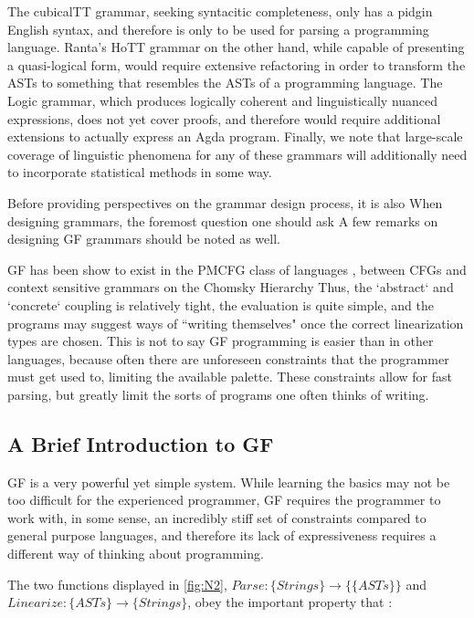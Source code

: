 The cubicalTT grammar, seeking syntacitic completeness, only has a pidgin
English syntax, and therefore is only to be used for parsing a programming language.
Ranta's HoTT grammar on the other hand, while capable of presenting a
quasi-logical form, would require extensive refactoring in order to transform
the ASTs to something that resembles the ASTs of a programming language. The
Logic grammar, which produces logically coherent and linguistically nuanced
expressions, does not yet cover proofs, and therefore would require additional extensions
to actually express an Agda program. Finally, we note that large-scale
coverage of linguistic phenomena for any of these grammars will additionally
need to incorporate statistical methods in some way. 

Before providing perspectives on the grammar design process, it is also 
When designing grammars, the foremost question one should ask
A few remarks on designing GF grammars should be noted as well. 

GF has been show to exist in the PMCFG class of languages \cite{seki91pmcfg},
between CFGs and context sensitive grammars on the Chomsky Hierarchy
\cite{chomsky1956hierarchy} Thus, the `abstract` and `concrete` coupling is
relatively tight, the evaluation is quite simple, and the programs may suggest
ways of ``writing themselves" once the correct linearization types are chosen.
This is not to say GF programming is easier than in other languages, because
often there are unforeseen constraints that the programmer must get used to,
limiting the available palette. These constraints allow for fast parsing, but
greatly limit the sorts of programs one often thinks of writing.

\subsection{A Brief Introduction to GF}

GF is a very powerful yet simple system.  While learning the basics may not be
too difficult for the experienced programmer, GF requires the programmer to work
with, in some sense, an incredibly stiff set of constraints compared to general
purpose languages, and therefore its lack of expressiveness requires a different
way of thinking about programming.

The two functions displayed in \autoref{fig:N2}, $Parse : \{Strings\}
\rightarrow \{\{ASTs\}\}$ and $Linearize : \{ASTs\} \rightarrow \{Strings\}$, obey
the important property that :

